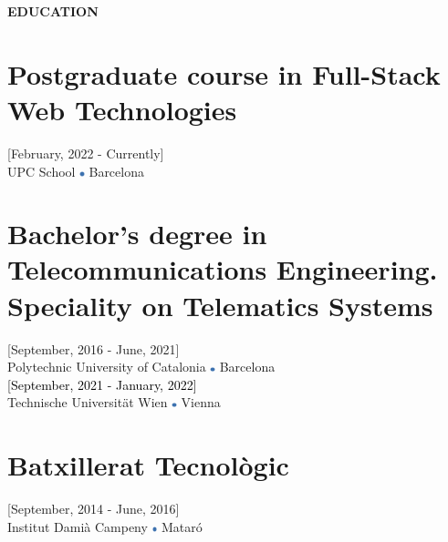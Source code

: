 \documentclass[../main.tex]{subfiles}
\begin{document}
    \vspace*{-0.4cm}
    \textbf{\textcolor{myCV2}{EDUCATION\underline{\hspace{7.62cm}}}}
        \vspace*{-0.3cm}
        
        \section*{Postgraduate course in Full-Stack Web Technologies}
        \vspace*{-0.4cm}
        [February, 2022 - Currently] \\
        UPC School
        \includegraphics[width=0.15cm]{assets/full.png} 
        Barcelona
        
        \vspace*{-0.25cm}
        \section*{Bachelor's degree in Telecommunications Engineering. Speciality on Telematics Systems}
        \vspace*{-0.4cm}
        [September, 2016 - June, 2021] \\
        Polytechnic University of Catalonia 
        \includegraphics[width=0.15cm]{assets/full.png} 
        Barcelona \\
        \textcolor{black}{[September, 2021 - January, 2022]}\\
        Technische Universität Wien
        \includegraphics[width=0.15cm]{assets/full.png} 
        Vienna
        
        \vspace*{-0.25cm}
        \section*{Batxillerat Tecnològic}
        \vspace*{-0.4cm}
        [September, 2014 - June, 2016] \\
        Institut Damià Campeny
        \includegraphics[width=0.15cm]{assets/full.png} 
        Mataró

\end{document}

